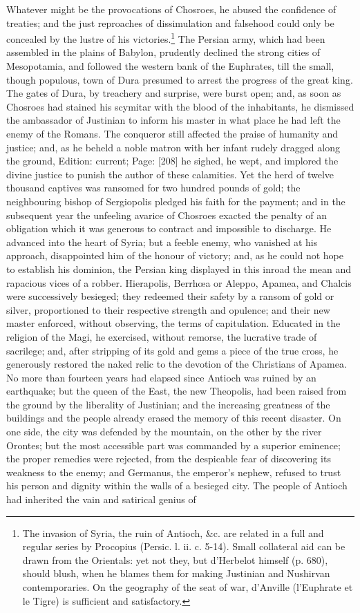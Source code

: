 Whatever might be the provocations of Chosroes, he abused the confidence of treaties; and the just reproaches of dissimulation and falsehood could only be concealed by the lustre of his victories.\footnote{The invasion of Syria, the ruin of Antioch, \&c. are related in a full and regular series by Procopius (Persic. l. ii. c. 5-14). Small collateral aid can be drawn from the Orientals: yet not they, but d\texthebrew{}’Herbelot himself (p. 680), should blush, when he blames them for making Justinian and Nushirvan contemporaries. On the geography of the seat of war, d\texthebrew{}’Anville (l\texthebrew{}’Euphrate et le Tigre) is sufficient and satisfactory.} The Persian army, which had been assembled in the plains of Babylon, prudently declined the strong cities of Mesopotamia, and followed the western bank of the Euphrates, till the small, though populous, town of Dura presumed to arrest the progress of the great king. The gates of Dura, by treachery and surprise, were burst open; and, as soon as Chosroes had stained his scymitar with the blood of the inhabitants, he dismissed the ambassador of Justinian to inform his master in what place he had left the enemy of the Romans. The conqueror still affected the praise of humanity and justice; and, as he beheld a noble matron with her infant rudely dragged along the ground, Edition: current; Page: [208] he sighed, he wept, and implored the divine justice to punish the author of these calamities. Yet the herd of twelve thousand captives was ransomed for two hundred pounds of gold; the neighbouring bishop of Sergiopolis pledged his faith for the payment; and in the subsequent year the unfeeling avarice of Chosroes exacted the penalty of an obligation which it was generous to contract and impossible to discharge. He advanced into the heart of Syria; but a feeble enemy, who vanished at his approach, disappointed him of the honour of victory; and, as he could not hope to establish his dominion, the Persian king displayed in this inroad the mean and rapacious vices of a robber. Hierapolis, Berrhœa or Aleppo, Apamea, and Chalcis were successively besieged; they redeemed their safety by a ransom of gold or silver, proportioned to their respective strength and opulence; and their new master enforced, without observing, the terms of capitulation. Educated in the religion of the Magi, he exercised, without remorse, the lucrative trade of sacrilege; and, after stripping of its gold and gems a piece of the true cross, he generously restored the naked relic to the devotion of the Christians of Apamea. No more than fourteen years had elapsed since Antioch was ruined by an earthquake; but the queen of the East, the new Theopolis, had been raised from the ground by the liberality of Justinian; and the increasing greatness of the buildings and the people already erased the memory of this recent disaster. On one side, the city was defended by the mountain, on the other by the river Orontes; but the most accessible part was commanded by a superior eminence; the proper remedies were rejected, from the despicable fear of discovering its weakness to the enemy; and Germanus, the emperor\texthebrew{}’s nephew, refused to trust his person and dignity within the walls of a besieged city. The people of Antioch had inherited the vain and satirical genius of 